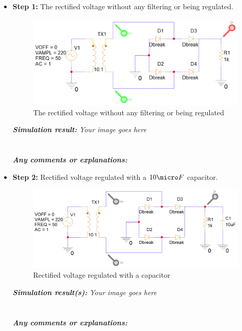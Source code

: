 \begin{itemize}
    \item \textbf{Step 1:} The rectified voltage without any filtering or being regulated.  \begin{figure}[H] \centering \includegraphics[width=\linewidth]{source/content/lab2_ex9_step1.png} \caption{The rectified voltage without any filtering or being regulated} \label{lab2_ex9_step1} \end{figure} \textit{\textbf{Simulation result:}} \textit{Your image goes here}\\ \\ \vspace{8cm} \\ \textbf{\textit{Any comments or explanations:}} \dotfill\bigskip\par\mbox{}\dotfill \dotfill\bigskip\par\mbox{}\dotfill \dotfill\bigskip\par\mbox{}\dotfill \dotfill\bigskip\par\mbox{}\dotfill \dotfill\bigskip\par\mbox{}\dotfill \dotfill\bigskip\par\mbox{}\dotfill \item \textbf{Step 2:} Rectified voltage regulated with a $10\micro F$ capacitor.  \begin{figure}[H] \centering \includegraphics[width=\linewidth]{source/content/lab2_ex9_step2.png} \caption{Rectified voltage regulated with a capacitor} \label{lab2_ex9_step2} \end{figure} \textit{\textbf{Simulation result(s):}} \textit{Your image goes here}\\ \\ \vspace{8cm} \\ \textbf{\textit{Any comments or explanations:}} \dotfill\bigskip\par\mbox{}\dotfill \dotfill\bigskip\par\mbox{}\dotfill \dotfill\bigskip\par\mbox{}\dotfill 
\end{itemize}
